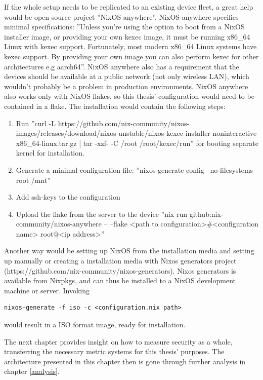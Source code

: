 If the whole setup needs to be replicated to an existing device fleet,
a great help would be open source project ''NixOS anywhere''. NixOS
anywhere specifies minimal specifications: ''Unless you're using the
option to boot from a NixOS installer image, or providing your own
kexec image, it must be running x86\_64 Linux with kexec
support. Fortunately, most modern x86\_64 Linux systems have kexec
support. By providing your own image you can also perform kexec for
other architectures e.g aarch64''. NixOS anywhere also has a
requirement that the devices should be available at a public network
(not only wireless LAN), which wouldn't probably be a problem in
production environments. NixOS anywhere also works only with NixOS
flakes, so this thesis' configuration would need to be contained in a
flake. \cite{githubGitHubNixcommunitynixosanywhere}
The installation would contain the following steps:
\begin{enumerate}
  \item Run ''curl -L
    https://github.com/nix-community/nixos-images/releases/download/nixos-unstable/nixos-kexec-installer-noninteractive-x86\_64-linux.tar.gz
    | tar -xzf- -C /root /root/kexec/run'' for booting separate kernel
    for installation.
  \item Generate a minimal configuration file: ''nixos-generate-config
    --no-filesystems --root /mnt''
  \item Add ssh-keys to the configuration
  \item Upload the flake from the server to the device ''nix run
    github:nix-community/nixos-anywhere -- --flake <path to
    configuration>#<configuration name> root@<ip address>''
\end{enumerate}
Another way would be setting up NixOS from the installation media and
setting up manually or creating a installation media with Nixos
generators project
(https://github.com/nix-community/nixos-generators). Nixos generators
is available from Nixpkgs, and can thus be installed to a NixOS
development machine or server. Invoking
\begin{lstlisting}
nixos-generate -f iso -c <configuration.nix path>
\end{lstlisting}
would result in a ISO format image, ready for
installation. \cite{githubGitHubNixcommunitynixosanywhere}

The next chapter provides insight on how to measure security as a
whole, transferring the necessary metric systems for this thesis'
purposes. The architecture presented in this chapter then is gone
through further analysis in chapter \ref{analysis}.
